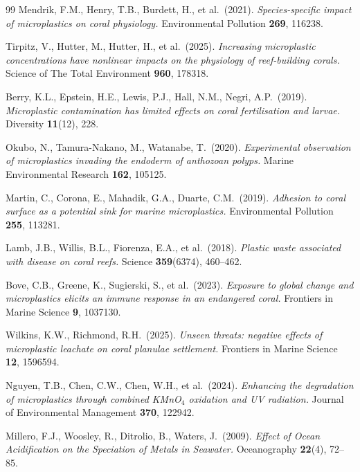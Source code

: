 ﻿\documentclass[12pt,a4paper]{article}
\theoremstyle{definition}
\theoremstyle{remark}
\begin{document}
\begin{thebibliography}{99}
Mendrik, F.M., Henry, T.B., Burdett, H., et al.\ (2021).
\textit{Species-specific impact of microplastics on coral physiology.}
Environmental Pollution \textbf{269}, 116238.

Tirpitz, V., Hutter, M., Hutter, H., et al.\ (2025).
\textit{Increasing microplastic concentrations have nonlinear impacts on the
physiology of reef-building corals.}
Science of The Total Environment \textbf{960}, 178318.

Berry, K.L., Epstein, H.E., Lewis, P.J., Hall, N.M., Negri, A.P.\ (2019).
\textit{Microplastic contamination has limited effects on coral fertilisation
and larvae.} Diversity \textbf{11}(12), 228.

Okubo, N., Tamura-Nakano, M., Watanabe, T.\ (2020).
\textit{Experimental observation of microplastics invading the endoderm of
anthozoan polyps.} Marine Environmental Research \textbf{162}, 105125.

Martin, C., Corona, E., Mahadik, G.A., Duarte, C.M.\ (2019).
\textit{Adhesion to coral surface as a potential sink for marine microplastics.}
Environmental Pollution \textbf{255}, 113281.

Lamb, J.B., Willis, B.L., Fiorenza, E.A., et al.\ (2018).
\textit{Plastic waste associated with disease on coral reefs.}
Science \textbf{359}(6374), 460--462.

Bove, C.B., Greene, K., Sugierski, S., et al.\ (2023).
\textit{Exposure to global change and microplastics elicits an immune response
in an endangered coral.} Frontiers in Marine Science \textbf{9}, 1037130.

Wilkins, K.W., Richmond, R.H.\ (2025).
\textit{Unseen threats: negative effects of microplastic leachate on coral
planulae settlement.} Frontiers in Marine Science \textbf{12}, 1596594.

Nguyen, T.B., Chen, C.W., Chen, W.H., et al.\ (2024).
\textit{Enhancing the degradation of microplastics through combined KMnO$_4$
oxidation and UV radiation.}
Journal of Environmental Management \textbf{370}, 122942.

Millero, F.J., Woosley, R., Ditrolio, B., Waters, J.\ (2009).
\textit{Effect of Ocean Acidification on the Speciation of Metals in Seawater.}
Oceanography \textbf{22}(4), 72--85.


\end{thebibliography}
\end{document}
